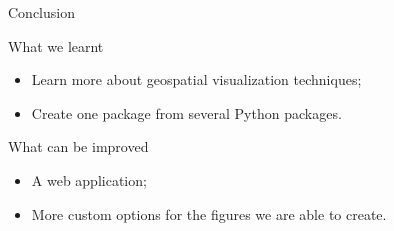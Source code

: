 \begin{frame}[fragile]{Conclusion}

\centering
\begin{block}{What we learnt}
    \begin{itemize}
        \item Learn more about geospatial visualization techniques;
        \item Create one package from several Python packages.
    \end{itemize}
\end{block}

\begin{block}{What can be improved}
    \begin{itemize}
            \item A web application;
            \item More custom options for the figures we are able to create.
        \end{itemize}
\end{block}

\end{frame}

